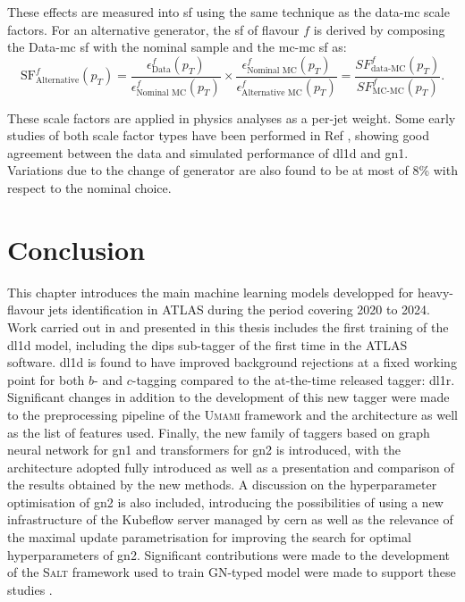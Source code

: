 \begin{itemize}
  These effects are measured into \gls{sf} using the same technique as the data-\gls{mc} scale factors. For an alternative generator, the \gls{sf} of flavour $f$ is derived by composing the Data-\gls{mc} \gls{sf} with the nominal sample and the \gls{mc}-\gls{mc} \gls{sf} as: \[\textrm{SF}^f_{\textrm{Alternative}}(p_T) = \frac{\epsilon^f_{\textrm{Data}}(p_T)}{\epsilon^f_{\textrm{Nominal MC}}(p_T)} \times \frac{\epsilon^f_{\textrm{Nominal MC}}(p_T)}{\epsilon^f_{\textrm{Alternative MC}}(p_T)} = \frac{SF^f_{\textrm{data-MC}}(p_T)}{SF^f_{\textrm{MC-MC}}(p_T)}.\] 
\end{itemize}
These scale factors are applied in physics analyses as a per-jet weight. Some early studies of both scale factor types have been performed in Ref \cite{ATL-PLOT-FTAG-2023-01}, showing good agreement between the data and simulated performance of \gls{dl1d} and \gls{gn1}. Variations due to the change of generator are also found to be at most of 8\% with respect to the nominal choice.

\section{Conclusion}
This chapter introduces the main machine learning models developped for heavy-flavour jets identification in ATLAS during the period covering 2020 to 2024. Work carried out in and presented in this thesis includes the first training of the \gls{dl1d} model, including the \gls{dips} sub-tagger of the first time in the ATLAS software. \gls{dl1d} is found to have improved background rejections at a fixed working point for both $b$- and $c$-tagging compared to the at-the-time released tagger: \gls{dl1r}. Significant changes in addition to the development of this new tagger were made to the preprocessing pipeline of the \textsc{Umami} framework \cite{UmamiCite} and the architecture as well as the list of features used. Finally, the new family of taggers based on graph neural network for \gls{gn1} and transformers for \gls{gn2} is introduced, with the architecture adopted fully introduced as well as a presentation and comparison of the results obtained by the new methods. A discussion on the hyperparameter optimisation of \gls{gn2} is also included, introducing the possibilities of using a new infrastructure of the Kubeflow server managed by \gls{cern} as well as the relevance of the maximal update parametrisation for improving the search for optimal hyperparameters of \gls{gn2}. Significant contributions were made to the development of the \textsc{Salt} framework used to train GN-typed model were made to support these studies \cite{SaltCite}. 

